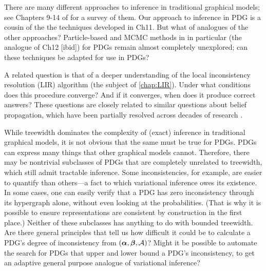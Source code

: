 There are many different approaches to inference in traditional graphical models;
see Chapters 9-14 of \citet{KF09} for a survey of them.
Our approach to inference in PDG is a cousin of the the techniques developed in Ch11. But what of analogues of the other approaches? 
Particle-based and MCMC methods in in particular (the analogue of Ch12 [ibid])
    for PDGs remain almost completely unexplored; can these techniques be adapted for use in PDGs?
    
A related question is that of a deeper understanding of the local inconsistency resolution (LIR) algorithm (the subject of \cref{chap:LIR}). 
Under what conditions does this procedure converge?
And if it converges, when does it produce correct answers?
These questions are closely related to similar questions about belief propagation, which have been partially resolved across decades of research
\citep{yedida-genpb,wiegerinck-fracbp,minka2005divergence}.


While treewidth dominates the complexity of (exact) inference in traditional graphical models, it is not obvious that the same must be true for PDGs. 
PDGs can express many things that other graphical models cannot. 
Therefore, there may be nontrivial subclasses of PDGs that are completely unrelated to treewidth, which still admit tractable inference. 
%
Some inconsistencies, for example, are easier to quantify than others---a fact to which variational inference owes its existence. 
In some cases, one can easily verify that a PDG has zero inconsistency through its hypergraph alone, without even looking at the probabilities.
(That is why it is possible to ensure representations are consistent by construction in the first place.)
Neither of these subclasses has anything to do with bounded treewidth. 
Are there general principles that tell us how difficult it could be to calculate a PDG's degree of inconsistency from $(\boldsymbol\alpha,\boldsymbol\beta,\mathcal A)$?
Might it be possible to automate the 
    search for PDGs that upper and lower bound a PDG's inconsistency,
    to get an adaptive general purpose analogue of variational inference?
    
